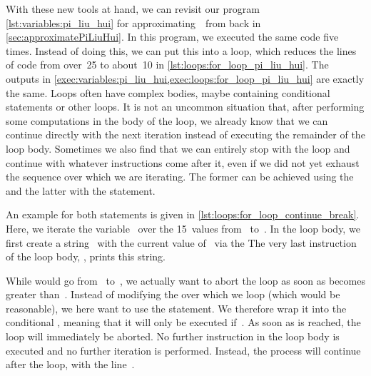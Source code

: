 With these new tools at hand, we can revisit our program \cref{lst:variables:pi_liu_hui} for approximating~\numberPi\ from back in \cref{sec:approximatePiLiuHui}.
In this program, we executed the same code five times.
Instead of doing this, we can put this into a loop, which reduces the lines of code from over~25 to about~10 in \cref{lst:loops:for_loop_pi_liu_hui}.
The outputs in \cref{exec:variables:pi_liu_hui,exec:loops:for_loop_pi_liu_hui} are exactly the same.%
%
\FloatBarrier%
\endhsection%
%
%
%
%
%
Loops often have complex bodies, maybe containing conditional statements or other loops.
It is not an uncommon situation that, after performing some computations in the body of the loop, we already know that we can continue directly with the next iteration instead of executing the remainder of the loop body.
Sometimes we also find that we can entirely stop with the loop and continue with whatever instructions come after it, even if we did not yet exhaust the sequence over which we are iterating.
The former can be achieved using the  and the latter with the  statement.

An example for both statements is given in \cref{lst:loops:for_loop_continue_break}.
Here, we iterate the variable~ over the 15~values from~ to~.
In the loop body, we first create a string~ with the current value of~ via the  
The very last instruction of the loop body, , prints this string.

While  would go from~ to~, we actually want to abort the loop as soon as  becomes greater than~.
Instead of modifying the  over which we loop (which would be reasonable), we here want to use the  statement.
We therefore wrap it into the conditional , meaning that it will only be executed if~.
As soon as  is reached, the loop will immediately be aborted.
No further instruction in the loop body is executed and no further iteration is performed.
Instead, the process will continue after the loop, with the line~.

